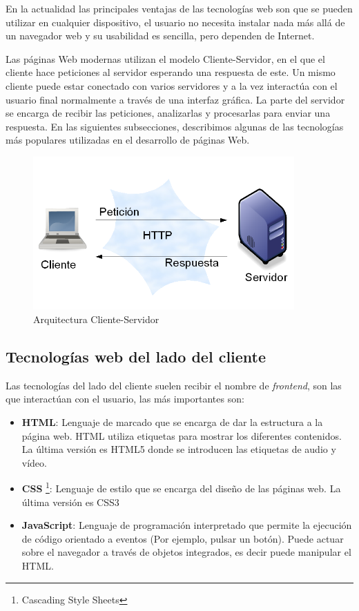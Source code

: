 En la actualidad las principales ventajas de las tecnologías web son que se pueden utilizar en cualquier dispositivo, el usuario no necesita instalar nada más allá de un navegador web y su usabilidad es sencilla, pero dependen de Internet.\cite{juan}

Las páginas Web modernas utilizan el modelo Cliente-Servidor, en el que el cliente hace peticiones al servidor esperando una respuesta de este. Un mismo cliente puede estar conectado con varios servidores y a la vez interactúa con el usuario final normalmente a través de una interfaz gráfica. La parte del servidor se encarga de recibir las peticiones, analizarlas y procesarlas para enviar una respuesta. En las siguientes subsecciones, describimos algunas de las tecnologías más populares utilizadas en el desarrollo de páginas Web.

\begin{figure}[H]
    \centering
    \includegraphics[width=10cm, keepaspectratio]{img/arquitectura.png}
    \caption{Arquitectura Cliente-Servidor}
    \label{fig:arquitectura}
\end{figure}

\subsection{Tecnologías web del lado del cliente}
Las tecnologías del lado del cliente suelen recibir el nombre de \textit{frontend}, son las que interactúan con el usuario, las más importantes son:

\begin{itemize}
  \item \textbf{HTML}:  Lenguaje de marcado que se encarga de dar la estructura a la página web. HTML utiliza etiquetas para mostrar los diferentes contenidos. La última versión es HTML5 donde se introducen las etiquetas de audio y vídeo.
  \item \textbf{CSS} \footnote{Cascading Style Sheets}: Lenguaje de estilo que se encarga del diseño de las páginas web. La última versión es CSS3
  \item \textbf{JavaScript}: Lenguaje de programación interpretado que permite la ejecución de código orientado a eventos (Por ejemplo, pulsar un botón). Puede actuar sobre el navegador a través de objetos integrados, es decir puede manipular el HTML.
\end{itemize}
\newpage

